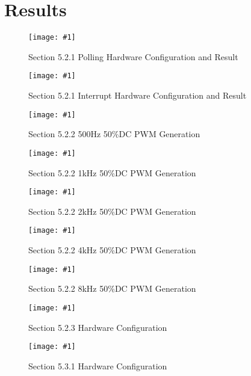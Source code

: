 \documentclass[journal]{IEEEtran}
\newcommand\createfigure[2]{
  \begin{figure}[H]
    \centering \texttt{[image: \#1]}
    \caption{#2}
  \end{figure}}
\begin{document}
\section{Results}
\createfigure{./Figures/5.2.1-Polling.jpg}{Section 5.2.1 Polling Hardware Configuration and Result}
\createfigure{./Figures/5.2.1-Interrupt.jpg}{Section 5.2.1 Interrupt Hardware Configuration and Result}
\createfigure{./Figures/5.2.2-500Hz.jpg}{Section 5.2.2 500\si{Hz} 50\%DC PWM Generation}
\createfigure{./Figures/5.2.2-1kHz.jpg}{Section 5.2.2 1\si{kHz} 50\%DC PWM Generation}
\createfigure{./Figures/5.2.2-2kHz.jpg}{Section 5.2.2 2\si{kHz} 50\%DC PWM Generation}
\createfigure{./Figures/5.2.2-4kHz.jpg}{Section 5.2.2 4\si{kHz} 50\%DC PWM Generation}
\createfigure{./Figures/5.2.2-8kHz.jpg}{Section 5.2.2 8\si{kHz} 50\%DC PWM Generation}
\createfigure{./Figures/5.2.3-Setup.jpg}{Section 5.2.3 Hardware Configuration}
\createfigure{./Figures/5.3.1-Setup.jpg}{Section 5.3.1 Hardware Configuration}
\nocite{rojasEmbeddedSystemsDesign2016}
\nocite{LCDControllerDatasheets}


\end{document}

